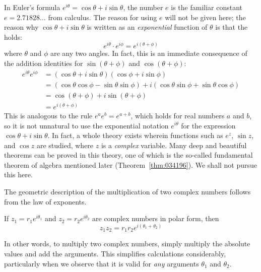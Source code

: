 \documentclass{ximera}
\begin{document}
In Euler's formula $e^{i\theta}= \cos \theta + i \sin \theta$, the number $e$ is the familiar constant $e = 2.71828\dots$  from calculus. The reason for using $e$ will not be given here; the reason why $\cos \theta + i \sin \theta$ is written as an \textit{exponential} function of $\theta$ is that the  holds:
\begin{equation*}
e^{i\theta} \cdot e^{i\phi} = e^{i (\theta + \phi)}
\end{equation*}
where $\theta$ and $\phi$ are any two angles. In fact, this is an immediate consequence of the addition identities for $\sin(\theta + \phi)$ and $\cos(\theta + \phi)$:
\newpage
\begin{align*}
e^{i\theta} e^{i\phi} &= (\cos \theta + i \sin \theta) (\cos \phi + i \sin \phi) \\
&= (\cos \theta \cos \phi - \sin \theta \sin \phi) + i (\cos \theta \sin \phi + \sin \theta \cos \phi) \\
&= \cos (\theta +  \phi) +i \sin (\theta + \phi) \\
& =e^{i (\theta + \phi)}
\end{align*}
This is analogous to the rule $e^{a}e^{b} = e^{a+b}$, which holds for real numbers $a$ and $b$, so it is not unnatural to use the exponential notation $e^{i\theta}$ for the expression $\cos \theta + i \sin \theta$. In fact, a whole theory exists wherein functions such as $e^{z}$, $\sin z$, and $\cos z$ are studied, where $z$ is a \textit{complex}
 variable. Many deep and beautiful theorems can be proved in this
theory, one of which is the so-called fundamental theorem of algebra
mentioned later (Theorem~\ref{thm:034196}). We shall not pursue this here.

The geometric description of the multiplication of two complex numbers follows from the law of exponents.

\begin{theorem}\label{th:034029}
If $z_{1} = r_{1}e^{i{\theta}_1}$ and $z_{2} = r_{2}e^{i{\theta}_2}$ are complex numbers in polar form, then
\begin{equation*}
z_1z_2 = r_1r_2e^{i (\theta_1 + \theta_2)}
\end{equation*}
\end{theorem}

In other words, to multiply two complex
 numbers, simply multiply the absolute values and add the arguments.
This simplifies calculations considerably, particularly when we observe
that it is valid for \textit{any} arguments $\theta_{1}$ and $\theta_{2}$.
\end{document}
